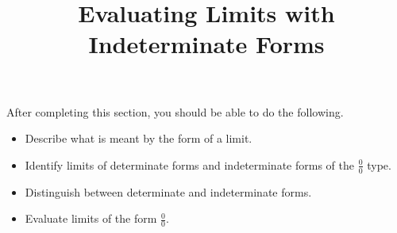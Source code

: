 \documentclass{ximera}
\title{Evaluating Limits with Indeterminate Forms}
\begin{document}
\begin{abstract}
\end{abstract}
\maketitle

\begin{sectionOutcomes}
After completing this section, you should be able to do the following.

\begin{itemize}
\item Describe what is meant by the form of a limit.
\item Identify limits of determinate forms and indeterminate forms of the $\frac{0}{0}$ type.
\item Distinguish between determinate and indeterminate forms.
\item Evaluate limits of the form $\frac{0}{0}$.
\end{itemize}
\end{sectionOutcomes}
\end{document}
